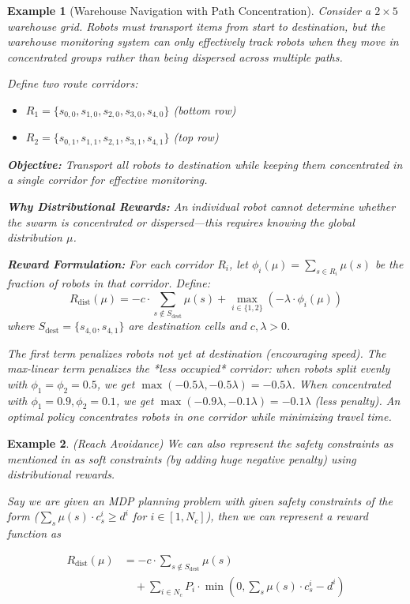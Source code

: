 \documentclass{article}
\newtheorem{example}{Example}
\begin{document}
\begin{example}[Warehouse Navigation with Path Concentration]\label{ex:concentration}
Consider a $2 \times 5$ warehouse grid. Robots must transport items from start to destination, but the warehouse monitoring system can only effectively track robots when they move in concentrated groups rather than being dispersed across multiple paths.

Define two route corridors:
\begin{itemize}
    \item $R_1 = \{s_{0,0}, s_{1,0}, s_{2,0}, s_{3,0}, s_{4,0}\}$ (bottom row)
    \item $R_2 = \{s_{0,1}, s_{1,1}, s_{2,1}, s_{3,1}, s_{4,1}\}$ (top row)
\end{itemize}

\textbf{Objective:} Transport all robots to destination while keeping them concentrated in a single corridor for effective monitoring.

\textbf{Why Distributional Rewards:} An individual robot cannot determine whether the swarm is concentrated or dispersed—this requires knowing the global distribution $\mu$.

\textbf{Reward Formulation:} For each corridor $R_i$, let $\phi_i(\mu) = \sum_{s \in R_i} \mu(s)$ be the fraction of robots in that corridor. Define:
\[
R_{\text{dist}}(\mu) = -c \cdot \sum_{s \notin S_{\text{dest}}} \mu(s) + \max_{i \in \{1,2\}} (-\lambda \cdot \phi_i(\mu))
\]
where $S_{\text{dest}} = \{s_{4,0}, s_{4,1}\}$ are destination cells and $c, \lambda > 0$.

The first term penalizes robots not yet at destination (encouraging speed). The max-linear term penalizes the *less occupied* corridor: when robots split evenly with $\phi_1 = \phi_2 = 0.5$, we get $\max(-0.5\lambda, -0.5\lambda) = -0.5\lambda$. When concentrated with $\phi_1 = 0.9, \phi_2 = 0.1$, we get $\max(-0.9\lambda, -0.1\lambda) = -0.1\lambda$ (less penalty). An optimal policy concentrates robots in one corridor while minimizing travel time.
\end{example}

\begin{example}{ (Reach Avoidance)} \label{ex:Reach-avoid}
We can also represent the safety constraints as mentioned in 
\cite{akshay2024certifiedpolicyverificationsynthesis} as soft constraints 
(by adding huge negative penalty) using distributional rewards.

Say we are given an MDP planning problem with given safety constraints of the form 
($\sum_{s}\mu(s)\cdot c_s^{i} \geq d^{i}$ for $i \in [1,N_c]$), then we can represent a reward function as

\[
\begin{aligned}
R_{\text{dist}}(\mu)
&= -c \cdot \sum_{s \notin S_{\text{dest}}} \mu(s) \\
&\quad + \sum_{i \in N_c} P_i \cdot \min\!\left(0, \sum_{s} \mu(s)\cdot c_s^{i} - d^{i}\right)
\end{aligned}
\]
\end{example}
\end{document}
